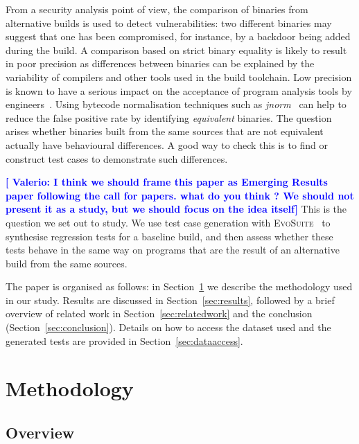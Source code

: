 \documentclass[conference]{IEEEtran}
\makeatletter
\newcommand{\evosuite}{\textsc{EvoSuite}\@\xspace}
\newcommand{\valerio}[1]{\textbf{\textcolor{blue}{[ \ding{46}Valerio: #1]}}}
\makeatother
\begin{document}
From a security analysis point of view, the comparison of binaries from alternative builds is used to detect vulnerabilities: two different binaries may suggest that one has been compromised, for instance, by a backdoor being added during the build. A comparison based on strict binary equality is likely to result in poor precision as differences between binaries can be explained by the variability of compilers and other tools used in the build toolchain. Low precision is known to have a serious impact on the acceptance of program analysis tools by engineers~\cite{sadowski2018lessons,distefano2019scaling}. Using bytecode normalisation techniques such as \textit{jnorm}~\cite{schott2024JNorm} can help to reduce the false positive rate by identifying \textit{equivalent} binaries. The question arises whether binaries built from the same sources that are not equivalent actually have behavioural differences. A good way to check this is to find or construct test cases to demonstrate such differences.

\valerio{I think we should frame this paper as Emerging Results paper following the call for papers. what do you think ? We should not present it as a study, but we should focus on the idea itself}
This is the question we set out to study. We use test case generation with \evosuite~\cite{fraser2011evosuite} to synthesise regression tests for a baseline build, and then assess whether these tests behave in the same way on programs that are the result of an alternative  build from the same sources. 

The paper is organised as follows: in Section~\ref{sec:methodology} we describe the methodology used in our study.  Results are discussed in Section~\ref{sec:results}, followed by a brief overview of related work in Section~\ref{sec:relatedwork} and the conclusion (Section~\ref{sec:conclusion}). Details on how to access the dataset used and the generated tests are provided in Section~\ref{sec:dataaccess}. 

\section{Methodology}
\label{sec:methodology}


\subsection{Overview}
\end{document}
